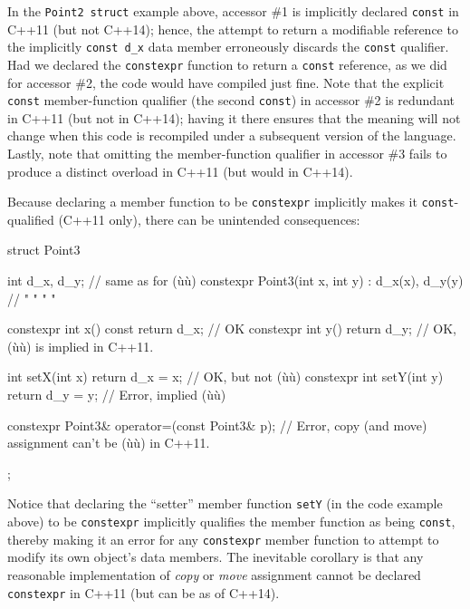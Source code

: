 \noindent In the \lstinline!Point2!~\lstinline!struct! example above, accessor \#1 is
implicitly declared \lstinline!const! in C++11 (but not C++14); hence, the
attempt to return a modifiable  reference to the implicitly
\lstinline!const!~\lstinline!d_x! data member erroneously discards the
\lstinline!const! qualifier. Had we declared the \lstinline!constexpr!
function to return a \lstinline!const! reference, as we did for accessor
\#2, the code would have compiled just fine. Note that the explicit
\lstinline!const! member-function qualifier (the second \lstinline!const!) in
accessor \#2 is redundant in C++11 (but not in C++14); having it there
ensures that the meaning will not change when this code is recompiled
under a subsequent version of the language. Lastly, note that omitting
the member-function qualifier in accessor \#3 fails to produce a
distinct overload in C++11 (but would in C++14).

Because declaring a member function to be \lstinline!constexpr! implicitly
makes it \lstinline!const!-qualified (C++11 only), there can be unintended
consequences:

\begin{emcppslisting}
struct Point3
{
    int d_x, d_y;                                        // same as for (ù{}ù)
    constexpr Point3(int x, int y) : d_x(x), d_y(y) { }  //   "  "   "     "

    constexpr int x() const { return d_x; }  // OK
    constexpr int y()       { return d_y; }  // OK, (ù{}ù) is implied in C++11.

              int setX(int x) { return d_x = x; }  // OK, but not (ù{}ù)
    constexpr int setY(int y) { return d_y = y; }  // Error, implied (ù{}ù)

    constexpr Point3& operator=(const Point3& p);
        // Error, copy (and move) assignment can't be (ù{}ù) in C++11.

};
\end{emcppslisting}
    

\noindent Notice that declaring the ``setter'' member function \lstinline!setY! (in
the code example above) to be \lstinline!constexpr! implicitly qualifies
the member function as being \lstinline!const!, thereby making it an error
for any \lstinline!constexpr! member function to attempt to modify its own
object's data members. The inevitable corollary is that any reasonable
implementation of \emph{copy} or \emph{move} assignment cannot be
declared \lstinline!constexpr! in C++11 (but can be as of C++14).

